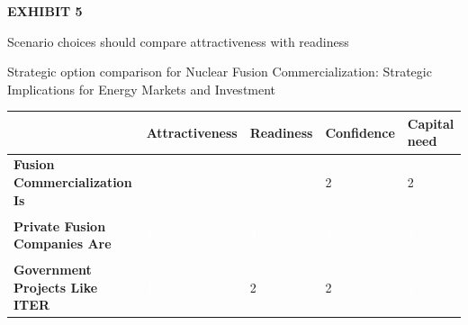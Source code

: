 \documentclass[10pt,a4paper]{article}
\begin{document}
\clearpage
{\textcolor{BOGreen}{\scriptsize\bfseries EXHIBIT 5}}\par\vspace{4pt}
{\sffamily\fontsize{17}{21}\selectfont\color{BONavy} Scenario choices should compare attractiveness with readiness}\par
{\small\color{BOText} Strategic option comparison for Nuclear Fusion Commercialization: Strategic Implications for Energy Markets and Investment}\par\vspace{6pt}
{\scriptsize\begin{tabular}{p{38mm}>{\centering\arraybackslash}p{21mm}>{\centering\arraybackslash}p{21mm}>{\centering\arraybackslash}p{21mm}>{\centering\arraybackslash}p{21mm}}
 & {\bfseries Attractiveness} & {\bfseries Readiness} & {\bfseries Confidence} & {\bfseries Capital need} \\
\hline
{\bfseries Fusion Commercialization Is} & \colorbox{BOGreen}{\textcolor{white}{\strut\hspace{5pt}5\hspace{5pt}}} & \colorbox{BOBlue}{\textcolor{white}{\strut\hspace{5pt}3\hspace{5pt}}} & \colorbox{BOLight}{\textcolor{BOText}{\strut\hspace{5pt}2\hspace{5pt}}} & \colorbox{BOLight}{\textcolor{BOText}{\strut\hspace{5pt}2\hspace{5pt}}} \\
{\bfseries Private Fusion Companies Are} & \colorbox{BOGreen}{\textcolor{white}{\strut\hspace{5pt}4\hspace{5pt}}} & \colorbox{BOGreen}{\textcolor{white}{\strut\hspace{5pt}4\hspace{5pt}}} & \colorbox{BOBlue}{\textcolor{white}{\strut\hspace{5pt}3\hspace{5pt}}} & \colorbox{BOBlue}{\textcolor{white}{\strut\hspace{5pt}3\hspace{5pt}}} \\
{\bfseries Government Projects Like ITER} & \colorbox{BOGreen}{\textcolor{white}{\strut\hspace{5pt}4\hspace{5pt}}} & \colorbox{BOLight}{\textcolor{BOText}{\strut\hspace{5pt}2\hspace{5pt}}} & \colorbox{BOLight}{\textcolor{BOText}{\strut\hspace{5pt}2\hspace{5pt}}} & \colorbox{BOGreen}{\textcolor{white}{\strut\hspace{5pt}4\hspace{5pt}}} \\

\end{tabular}}
\end{document}
